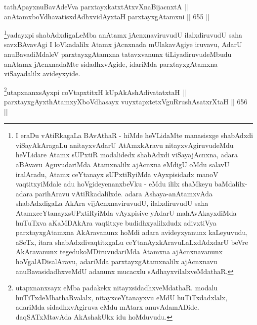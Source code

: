\begin{shl}
tathA\s payxnuBavAdeVva parxtayxkatxtAtxvXnaBijacnxtA || \\
anAtamxboVdhavatisxdAdhx\s vidAyx\s taH parxtayxgAtamxni \hfill || 655 ||  
\end{shl}

\begin{artha}
\footnote{I eraDu vAtiRkagaLa BAvAthaR - hiMde heVLidaMte manasisxge
shabAdxdi viSayAkAragaLu anitayxvAdarU AtAmxkAravu
nitayxvAgiruvudeMdu heVLidare Atamx sUPxtiR modalidedx shabAdxdi
viSayajAcnxna, adara aBAvavu AguvudariMda Atamxnalilx ajAcnxna
eMdigU oMdu salavU iralAradu, Atamx ceYtanayx sUPxtiRyiMda
vAyxpisidadx manoV vaqtitxyiMdale adu hoVgideyenanxbeVku - eMdu
ililx  shaMkeyu baMdalilx-adara parihAravu vAtiRkadalilxde. adara
Ashaya-anAtamxvAda shabAdxdigaLa AkAra vijAcnxnaviruvudU,
ilalxdiruvudU saha AtamxceYtanayxsUPxtiRyiMda vAyxpisive yAdarU
mahAvAkayxdiMda huTuTxva aKaMDAkAra vaqtitxye budidhxyalilxdudx
adivxtiVya parxtayxgAtamxna AkAravanunx hoMdi adara avideyxyanunx
kaLeyuvudu, aSeTx, itara shabAdxdivaqtitxgaLu ceYtanAyxkAravuLaLxdAdxdarU beVre AkAravanunx tegedukoMDiruvudariMda
Atamxna ajAcnxnavanunx hoVgalADisalAravu, adariMda
parxtayxgAtamxnalilx ajAcnxnavu anuBavasidadhxveMdU adanunx mucacxlu
sAdhayxvilalxveMdathaR.}yadayxpi shabAdxdigaLeMba anAtamx jAcnxnaviruvudU
ilalxdiruvudU saha savxBAvavAgi I loVkadalilx Atamx jAcnxnada
mUlakavAgiye iruvavu, AdarU anuBavadiMdaleV parxtayxgAtamxna
tatavxvanunx tiLiyadiruvudeMbudu anAtamx jAcnxnadaMte sidadhxvAgide,
idariMda parxtayxgAtamxna viSayadalilx avideyxyide.
\end{artha}



\begin{shl}
\footnote{utapxnanxsayx eMba padakekx nitayxsidadhxveMdathaR. modalu
huTiTxdeMbathaRvalalx, nitayxceYtanayxvu eMdU huTiTxdadxlalx,
adariMda sidadhxvAgiruva eMdu mAtarx anuvAdamADide. daqSATxMtavAda
AkAshakUkx idu hoMduvudu.}utapxnanxsAyxpi coVtapxtitxH kUpAkAshAdivatatxtaH ||  \\
parxtayxgAyxthAtamxyXboVdhasayx vuyxtapxtetxVguRrushAsatxrXtaH \hfill || 656 ||
\end{shl}

